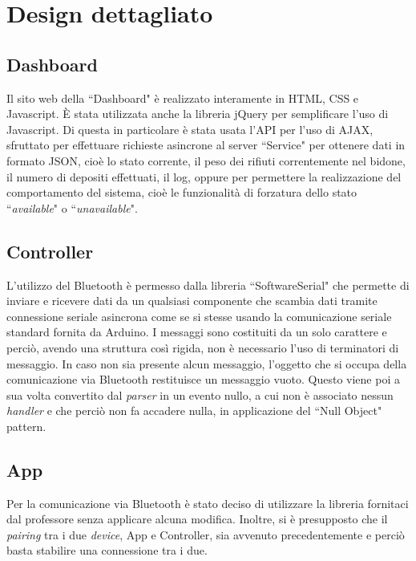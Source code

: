 \documentclass[a4paper, 12pt]{report}
\begin{document}
		\section{Design dettagliato}
			\subsection{Dashboard}
			Il sito web della ``Dashboard" è realizzato interamente in HTML, CSS e Javascript. È stata
			utilizzata anche la libreria jQuery per semplificare l'uso di Javascript. Di questa in
			particolare è stata usata l'API per l'uso di AJAX, sfruttato per effettuare richieste
			asincrone al server ``Service" per ottenere dati in formato JSON, cioè lo stato corrente,
			il peso dei rifiuti correntemente nel bidone, il numero di depositi effettuati, il log,
			oppure per permettere la realizzazione del comportamento del sistema, cioè le
			funzionalità di forzatura dello stato ``\textit{available}" o ``\textit{unavailable}".
			\subsection{Controller}
			L'utilizzo del Bluetooth è permesso dalla libreria ``SoftwareSerial" che permette di inviare
			e ricevere dati da un qualsiasi componente che scambia dati tramite connessione seriale
			asincrona come se si stesse usando la comunicazione seriale standard fornita da Arduino.
			\newline I messaggi sono costituiti da un solo carattere e perciò, avendo una struttura così
			rigida, non è necessario l'uso di terminatori di messaggio.\newline
			In caso non sia presente alcun messaggio, l'oggetto che si occupa della comunicazione via
			Bluetooth restituisce un messaggio vuoto. Questo viene poi a sua volta convertito dal
			\textit{parser} in un evento nullo, a cui non è associato nessun \textit{handler} e che
			perciò non fa accadere nulla, in applicazione del ``Null Object" pattern.
			\subsection{App}
			Per la comunicazione via Bluetooth è stato deciso di utilizzare la libreria fornitaci dal
			professore senza applicare alcuna modifica. Inoltre, si è presupposto che il \textit{pairing}
			tra i due \textit{device}, App e Controller, sia avvenuto precedentemente e perciò basta
			stabilire una connessione tra i due.
\end{document}
